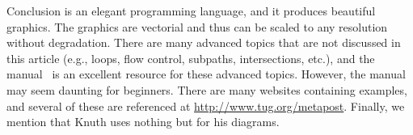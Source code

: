 \begin{section}{Conclusion}
\MP{} is an elegant programming language, and it produces beautiful graphics.  The graphics are vectorial and thus can be scaled to any resolution without degradation.  There are many advanced topics that are not discussed in this article (e.g., loops, flow control, subpaths, intersections, etc.), and the \MP{} manual~\cite{hobby:user} is an excellent resource for these advanced topics.  However, the \MP{} manual may seem daunting for beginners.  There are many websites containing \MP{} examples, and several of these are referenced at \url{http://www.tug.org/metapost}.  Finally, we mention that Knuth uses nothing but \MP{} for his diagrams.
\end{section}
